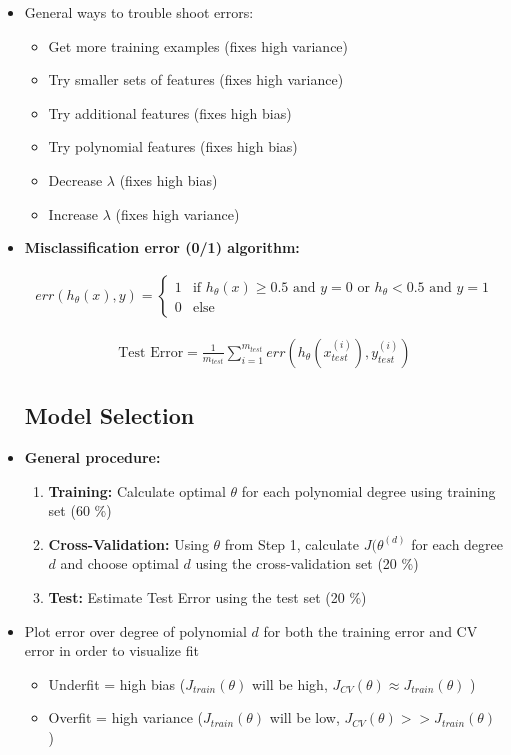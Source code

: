 \documentclass[titlepage]{article}
\begin{document}
\begin{itemize}
\item General ways to trouble shoot errors:
\begin{itemize} [label = $\bullet$]
\item Get more training examples (fixes high variance)
\item Try smaller sets of features (fixes high variance)
\item Try additional features (fixes high bias)
\item Try polynomial features (fixes high bias)
\item Decrease $\lambda$ (fixes high bias)
\item Increase $\lambda$ (fixes high variance)
\end{itemize}

\item \textbf{Misclassification error (0/1) algorithm:}

\begin{align*}
err(h_\theta(x),y) = \begin{cases} 1 &\mbox{if } h_\theta(x) \geq 0.5 \text{ and } y=0 \text{ or } h_\theta < 0.5 \text{ and } y=1 \\
	0 &\mbox{else } \end{cases}
\end{align*}

\begin{align*}
\text{Test Error} = \frac{1}{m_{test}} \sum_{i=1}^{m_{test}} err(h_\theta(x_{test}^{(i)}), y_{test}^{(i)})
\end{align*}

\subsection {Model Selection}
\item \textbf{General procedure:}
\begin{enumerate}
\item \textbf{Training:} Calculate optimal $\theta$ for each polynomial degree using training set (60 \%)
\item \textbf{Cross-Validation:} Using $\theta$ from Step 1, calculate $J(\theta^{(d)}$ for each degree $d$ and choose optimal $d$ using the cross-validation set (20 \%)
\item \textbf{Test:} Estimate Test Error using the test set (20 \%)
\end{enumerate}

\item Plot error over degree of polynomial $d$ for both the training error and CV error in order to visualize fit
\begin{itemize}[label = $\bullet$]
\item Underfit = high bias ($J_{train}(\theta)$ will be high, $J_{CV}(\theta) \approx J_{train}(\theta)$ )
\item Overfit = high variance ($J_{train}(\theta)$ will be low, $J_{CV}(\theta) >> J_{train}(\theta)$ )
\end {itemize}



\end{itemize}
\end{document}
